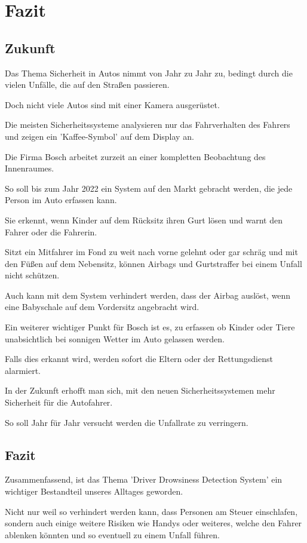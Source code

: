 \section{Fazit}
\subsection{Zukunft}

Das Thema Sicherheit in Autos nimmt von Jahr zu Jahr zu, bedingt durch die vielen Unfälle, die auf den Straßen passieren.

Doch nicht viele Autos sind mit einer Kamera ausgerüstet.

Die meisten Sicherheitssysteme analysieren nur das Fahrverhalten des Fahrers und zeigen ein 'Kaffee-Symbol' auf dem Display an.

Die Firma Bosch arbeitet zurzeit an einer kompletten Beobachtung des Innenraumes.

So soll bis zum Jahr 2022 ein System auf den Markt gebracht werden, die jede Person im Auto erfassen kann.

Sie erkennt, wenn Kinder auf dem Rücksitz ihren Gurt lösen und warnt den Fahrer oder die Fahrerin.

Sitzt ein Mitfahrer im Fond zu weit nach vorne gelehnt oder gar schräg und mit den Füßen auf dem Nebensitz, können Airbags und Gurtstraffer bei einem Unfall nicht schützen. 

Auch kann mit dem System verhindert werden, dass der Airbag auslöst, wenn eine Babyschale auf dem Vordersitz angebracht wird. 

Ein weiterer wichtiger Punkt für Bosch ist es, zu erfassen ob Kinder oder Tiere unabsichtlich bei sonnigen Wetter im Auto gelassen werden. 

Falls dies erkannt wird, werden sofort die Eltern oder der Rettungsdienst alarmiert.  

In der Zukunft erhofft man sich, mit den neuen Sicherheitssystemen mehr Sicherheit für die Autofahrer. 

So soll Jahr für Jahr versucht werden die Unfallrate zu verringern.\cite{b7}

\subsection{Fazit}

Zusammenfassend, ist das Thema 'Driver Drowsiness Detection System' ein wichtiger Bestandteil unseres Alltages geworden.

Nicht nur weil so verhindert werden kann, dass Personen am Steuer einschlafen,
sondern auch einige weitere Risiken wie Handys oder weiteres, welche den Fahrer ablenken könnten und so eventuell zu einem Unfall führen.

